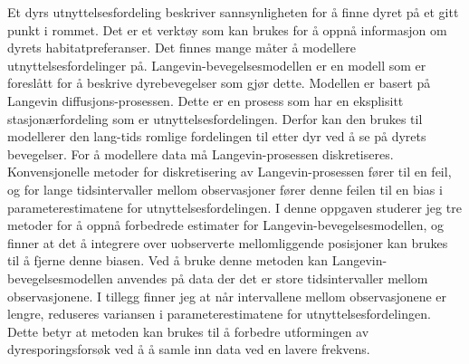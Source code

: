 Et dyrs utnyttelsesfordeling beskriver sannsynligheten for å finne dyret på et gitt punkt i rommet. Det er et verktøy som kan brukes for å oppnå informasjon om dyrets habitatpreferanser. Det finnes mange måter å modellere utnyttelsesfordelinger på. Langevin-bevegelsesmodellen er en modell som er foreslått for å beskrive dyrebevegelser som gjør dette. Modellen er basert på Langevin diffusjons-prosessen. Dette er en prosess som har en eksplisitt stasjonærfordeling som er utnyttelsesfordelingen. Derfor kan den brukes til modellerer den lang-tids romlige fordelingen til etter dyr ved å se på dyrets bevegelser. For å modellere data må Langevin-prosessen diskretiseres. Konvensjonelle metoder for diskretisering av Langevin-prosessen fører til en feil, og for lange tidsintervaller mellom observasjoner fører denne feilen til en bias i parameterestimatene for utnyttelsesfordelingen. I denne oppgaven studerer jeg tre metoder for å oppnå forbedrede estimater for Langevin-bevegelsesmodellen, og finner at det å integrere over uobserverte mellomliggende posisjoner kan brukes til å fjerne denne biasen. Ved å bruke denne metoden kan Langevin-bevegelsesmodellen anvendes på data der det er store tidsintervaller mellom observasjonene. I tillegg finner jeg at når intervallene mellom observasjonene er lengre, reduseres variansen i parameterestimatene for utnyttelsesfordelingen. Dette betyr at metoden kan brukes til å forbedre utformingen av dyresporingsforsøk ved å å samle inn data ved en lavere frekvens.











\newpage
\null
\thispagestyle{empty}
\newpage